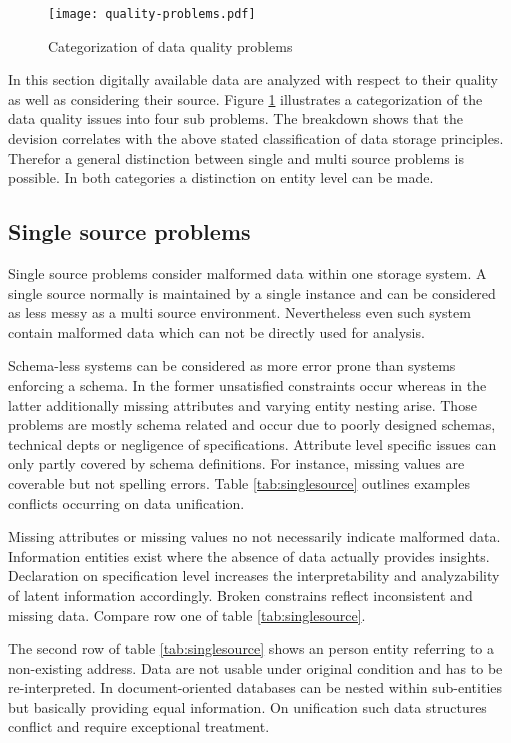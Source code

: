 \begin{figure}[htb]
  \centering
  \texttt{[image: quality-problems.pdf]}\\
  \caption{Categorization of data quality problems}\label{fig:qualityproblems}
\end{figure}

In this section digitally available data are analyzed with respect to their quality as well as considering their source. Figure \ref{fig:qualityproblems} illustrates a categorization of the data quality issues into four sub problems. The breakdown shows that the devision correlates with the above stated classification of data storage principles. Therefor a general distinction between single and multi source problems is possible. In both categories a distinction on entity level can be made. 

\subsection{Single source problems}

Single source problems consider malformed data within one storage system. A single source normally is maintained by a single instance and can be considered as less messy as a multi source environment. Nevertheless even such system contain malformed data which can not be directly used for analysis.

Schema-less systems can be considered as more error prone than systems enforcing a schema. In the former unsatisfied constraints occur whereas in the latter additionally missing attributes and varying entity nesting arise. Those problems are mostly schema related and occur due to poorly designed schemas, technical depts or negligence of specifications. Attribute level specific issues can only partly covered by schema definitions. For instance, missing values are coverable but not spelling errors. Table \ref{tab:singlesource} outlines examples conflicts occurring on data unification. 

Missing attributes or missing values no not necessarily indicate malformed data. Information entities exist where the absence of data actually provides insights. Declaration on specification level increases the interpretability and analyzability of latent information accordingly. Broken constrains reflect inconsistent and missing data. Compare row one of table \ref{tab:singlesource}.

The second row of table \ref{tab:singlesource} shows an person entity referring to a non-existing address. Data are not usable under original condition and has to be re-interpreted. In document-oriented databases can be nested within sub-entities but basically providing equal information. On unification such data structures conflict and require exceptional treatment. 

